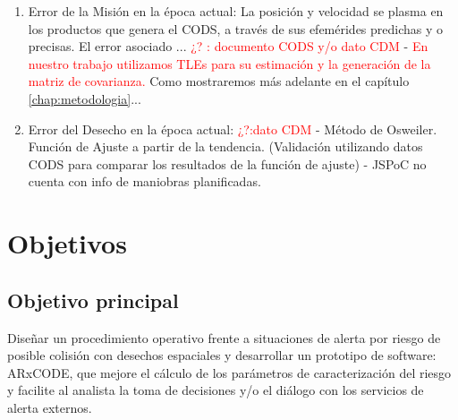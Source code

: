\begin{enumerate}
 \item Error de la Misi\'on en la \'epoca actual: La posici\'on y velocidad se plasma en los productos que genera el CODS, a trav\'es de sus efem\'erides predichas y o precisas. El error asociado ... {\textcolor{red}{¿? : documento CODS y/o dato CDM}} - {\textcolor{red}{En nuestro trabajo utilizamos TLEs para su estimaci\'on y la generaci\'on de la matriz de covarianza.}} Como mostraremos m\'as adelante en el capítulo \ref{chap:metodologia}...\\
 \item Error del Desecho en la \'epoca actual: {\textcolor{red}{¿?:dato CDM}} - M\'etodo de Osweiler. Funci\'on de Ajuste a partir de la tendencia. (Validaci\'on utilizando datos CODS para comparar los resultados de la funci\'on de ajuste) - JSPoC no cuenta con info de maniobras planificadas.
 
\end{enumerate}




\section{Objetivos}



\subsection*{Objetivo principal}
Diseñar un procedimiento operativo frente a situaciones de alerta por riesgo de posible
colisi\'on con desechos espaciales y desarrollar un prototipo de software: ARxCODE, que
mejore el c\'alculo de los par\'ametros de caracterizaci\'on del riesgo y facilite al analista la
toma de decisiones y/o el di\'alogo con los servicios de alerta externos.\\


